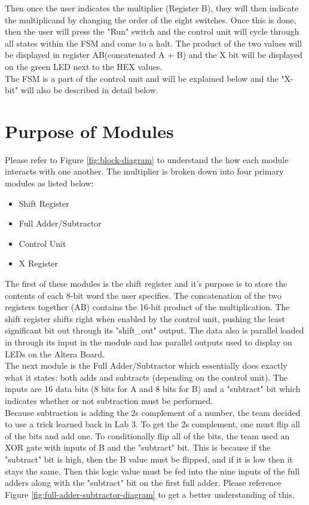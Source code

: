 \documentclass[journal, twocolumn, final,11pt,letterpaper]{IEEEtran}
\begin{document}
Then once the user indicates the multiplier (Register B), they will then indicate the multiplicand by changing the order of the eight switches. Once this is done, then the user will press the "Run" switch and the control unit will cycle through all states within the FSM and come to a halt. The product of the two values will be displayed in register AB(concatenated A + B) and the X bit will be displayed on the green LED next to the HEX values. \\

The FSM is a part of the control unit and will be explained below and the "X-bit" will also be described in detail below. 

\section{Purpose of Modules}
Please refer to Figure \ref{fig:block-diagram} to understand the how each module interacts with one another. The multiplier is broken down into four primary modules as listed below:
\begin{itemize}
	\item Shift Register 
	\item Full Adder/Subtractor
	\item Control Unit 
	\item X Register 
\end{itemize} 

The first of these modules is the shift register and it's purpose is to store the contents of each 8-bit word the user specifies. The concatenation of the two registers together (AB) contains the 16-bit product of the multiplication. The shift register shifts right when enabled by the control unit, pushing the least significant bit out through its "shift\_out" output. The data also is parallel loaded in through its input in the module and has parallel outputs used to display on LEDs on the Altera Board. \\

The next module is the Full Adder/Subtractor which essentially does exactly what it states: both adds and subtracts (depending on the control unit). The inputs are 16 data bits (8 bits for A and 8 bits for B) and a "subtract" bit which indicates whether or not subtraction must be performed.\\

Because subtraction is adding the 2s complement of a number, the team decided to use a trick learned back in Lab 3. To get the 2s complement, one must flip all of the bits and add one. To conditionally flip all of the bits, the team used an XOR gate with inputs of B and the "subtract" bit. This is because if the "subtract" bit is high, then the B value must be flipped, and if it is low then it stays the same. Then this logic value must be fed into the nine inputs of the full adders along with the "subtract" bit on the first full adder. Please reference Figure \ref{fig:full-adder-subtractor-diagram} to get a better understanding of this. \\
\end{document}
